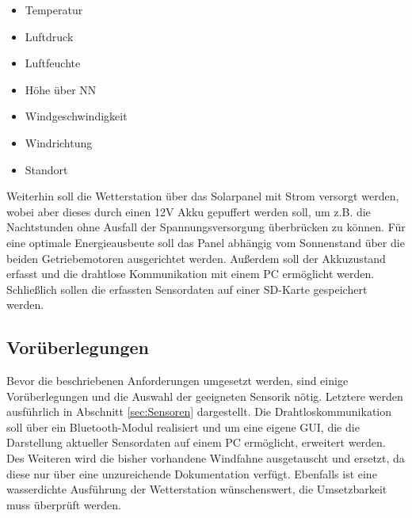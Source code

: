 \begin{itemize}
\item Temperatur
\item Luftdruck
\item Luftfeuchte
\item Höhe über NN
\item Windgeschwindigkeit
\item Windrichtung
\item Standort
\end{itemize}

Weiterhin soll die Wetterstation über das Solarpanel mit Strom versorgt werden, wobei aber dieses durch einen 12V Akku gepuffert werden soll, um z.B. die Nachtstunden ohne Ausfall der Spannungsversorgung überbrücken zu können. Für eine optimale Energieausbeute soll das Panel abhängig vom Sonnenstand über die beiden Getriebemotoren ausgerichtet werden. Außerdem soll der Akkuzustand erfasst und die drahtlose Kommunikation mit einem PC ermöglicht werden. Schließlich sollen die erfassten Sensordaten auf einer SD-Karte gespeichert werden.


\subsection{Vorüberlegungen}\label{subsec:Vorueberlegungen}
Bevor die beschriebenen Anforderungen umgesetzt werden, sind einige Vorüberlegungen und die Auswahl der geeigneten Sensorik nötig. Letztere werden ausführlich in Abschnitt \ref{sec:Sensoren} dargestellt. Die Drahtloskommunikation soll über ein Bluetooth-Modul realisiert und um eine eigene GUI, die die Darstellung aktueller Sensordaten auf einem PC ermöglicht, erweitert werden. Des Weiteren wird die bisher vorhandene Windfahne ausgetauscht und ersetzt, da diese nur über eine unzureichende Dokumentation verfügt.
Ebenfalls ist eine wasserdichte Ausführung der Wetterstation wünschenswert, die Umsetzbarkeit muss überprüft werden.
